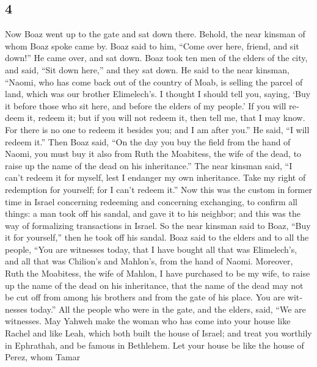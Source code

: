 \begin{paracol}{2}
\begin{otherlanguage}{english}
\hypertarget{section-7}{%
\section{4}\label{section-7}}

 Now Boaz went up to the gate and sat down there. Behold,
the near kinsman of whom Boaz spoke came by. Boaz said to him, ``Come
over here, friend, and sit down!'' He came over, and sat down.
 Boaz took ten men of the elders of the city, and said,
``Sit down here,'' and they sat down.  He said to the near
kinsman, ``Naomi, who has come back out of the country of Moab, is
selling the parcel of land, which was our brother Elimelech's.
 I thought I should tell you, saying, `Buy it before those
who sit here, and before the elders of my people.' If you will redeem
it, redeem it; but if you will not redeem it, then tell me, that I may
know. For there is no one to redeem it besides you; and I am after
you.'' He said, ``I will redeem it.''  Then Boaz said,
``On the day you buy the field from the hand of Naomi, you must buy it
also from Ruth the Moabitess, the wife of the dead, to raise up the name
of the dead on his inheritance.''  The near kinsman said,
``I can't redeem it for myself, lest I endanger my own inheritance. Take
my right of redemption for yourself; for I can't redeem it.''
 Now this was the custom in former time in Israel
concerning redeeming and concerning exchanging, to confirm all things: a
man took off his sandal, and gave it to his neighbor; and this was the
way of formalizing transactions in Israel.  So the near
kinsman said to Boaz, ``Buy it for yourself,'' then he took off his
sandal.  Boaz said to the elders and to all the people,
``You are witnesses today, that I have bought all that was Elimelech's,
and all that was Chilion's and Mahlon's, from the hand of Naomi.
 Moreover, Ruth the Moabitess, the wife of Mahlon, I have
purchased to be my wife, to raise up the name of the dead on his
inheritance, that the name of the dead may not be cut off from among his
brothers and from the gate of his place. You are witnesses today.''
 All the people who were in the gate, and the elders,
said, ``We are witnesses. May Yahweh make the woman who has come into
your house like Rachel and like Leah, which both built the house of
Israel; and treat you worthily in Ephrathah, and be famous in Bethlehem.
 Let your house be like the house of Perez, whom Tamar

\end{otherlanguage}
\end{paracol}
